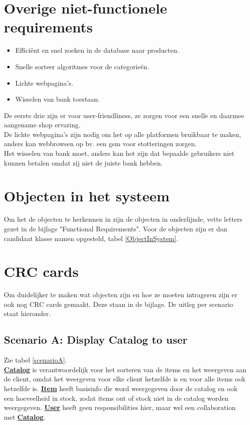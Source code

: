 \documentclass[•]{article}
\begin{document}
\section{Overige niet-functionele requirements}
\begin{itemize}
\item Effici\"ent en snel zoeken in de database naar producten.
\item Snelle sorteer algoritmes voor de categorie\"en.
\item Lichte webpagina's.
\item Wisselen van bank toestaan.
\end{itemize}
De eerste drie zijn er voor user-friendliness, ze zorgen voor een snelle en daarmee aangename shop ervaring.\\
De lichte webpagina's zijn nodig om het op alle platformen bruikbaar te maken, anders kan webbrowsen op bv. een gsm voor stotteringen zorgen.\\
Het wisselen van bank moet, anders kan het zijn dat bepaalde gebruikers niet kunnen betalen omdat zij niet de juiste bank hebben.

\section{Objecten in het systeem}
Om het de objecten te herkennen in zijn de objecten in onderlijnde, vette letters gezet in de bijlage "Functional Requirements". Voor de objecten zijn er dan candidaat klasse namen opgesteld, tabel \ref{ObjectInSystem}.

\section{CRC cards}
Om duidelijker te maken wat objecten zijn en hoe ze moeten intrageren zijn er ook nog CRC cards gemaakt. Deze staan in de bijlage. De uitleg per scenario staat hieronder.

\subsection{Scenario A: Display Catalog to user}
Zie tabel \ref{scenarioA}.\\
\textbf{\underline{Catalog}} is verantwoordelijk voor het sorteren van de items en het weergeven aan de client, omdat het weergeven voor elke client hetzelfde is en voor alle items ook hetzelfde is. \textbf{\underline{Item}} heeft basisinfo die word weergegeven door de catalog en ook een hoeveelheid in stock, zodat items out of stock niet in de catalog worden weergegeven. \textbf{\underline{User}} heeft geen responsibilities hier, maar wel een collaboration met \textbf{\underline{Catalog}}.
\end{document}
